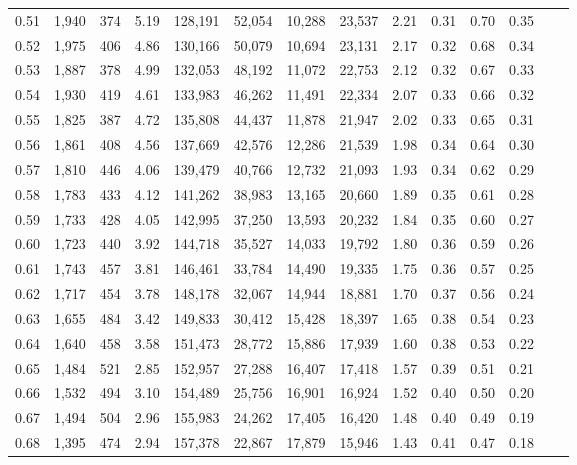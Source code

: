 \begin{tabular}{rrrrrrrrrrrrrr}
0.51 &  1,940 &  374 &    5.19 &  128,191 &   52,054 &  10,288 &  23,537 &  2.21 &  0.31 &  0.70 &      0.35 \\
0.52 &  1,975 &  406 &    4.86 &  130,166 &   50,079 &  10,694 &  23,131 &  2.17 &  0.32 &  0.68 &      0.34 \\
0.53 &  1,887 &  378 &    4.99 &  132,053 &   48,192 &  11,072 &  22,753 &  2.12 &  0.32 &  0.67 &      0.33 \\
0.54 &  1,930 &  419 &    4.61 &  133,983 &   46,262 &  11,491 &  22,334 &  2.07 &  0.33 &  0.66 &      0.32 \\
0.55 &  1,825 &  387 &    4.72 &  135,808 &   44,437 &  11,878 &  21,947 &  2.02 &  0.33 &  0.65 &      0.31 \\
0.56 &  1,861 &  408 &    4.56 &  137,669 &   42,576 &  12,286 &  21,539 &  1.98 &  0.34 &  0.64 &      0.30 \\
0.57 &  1,810 &  446 &    4.06 &  139,479 &   40,766 &  12,732 &  21,093 &  1.93 &  0.34 &  0.62 &      0.29 \\
0.58 &  1,783 &  433 &    4.12 &  141,262 &   38,983 &  13,165 &  20,660 &  1.89 &  0.35 &  0.61 &      0.28 \\
0.59 &  1,733 &  428 &    4.05 &  142,995 &   37,250 &  13,593 &  20,232 &  1.84 &  0.35 &  0.60 &      0.27 \\
0.60 &  1,723 &  440 &    3.92 &  144,718 &   35,527 &  14,033 &  19,792 &  1.80 &  0.36 &  0.59 &      0.26 \\
0.61 &  1,743 &  457 &    3.81 &  146,461 &   33,784 &  14,490 &  19,335 &  1.75 &  0.36 &  0.57 &      0.25 \\
0.62 &  1,717 &  454 &    3.78 &  148,178 &   32,067 &  14,944 &  18,881 &  1.70 &  0.37 &  0.56 &      0.24 \\
0.63 &  1,655 &  484 &    3.42 &  149,833 &   30,412 &  15,428 &  18,397 &  1.65 &  0.38 &  0.54 &      0.23 \\
0.64 &  1,640 &  458 &    3.58 &  151,473 &   28,772 &  15,886 &  17,939 &  1.60 &  0.38 &  0.53 &      0.22 \\
0.65 &  1,484 &  521 &    2.85 &  152,957 &   27,288 &  16,407 &  17,418 &  1.57 &  0.39 &  0.51 &      0.21 \\
0.66 &  1,532 &  494 &    3.10 &  154,489 &   25,756 &  16,901 &  16,924 &  1.52 &  0.40 &  0.50 &      0.20 \\
0.67 &  1,494 &  504 &    2.96 &  155,983 &   24,262 &  17,405 &  16,420 &  1.48 &  0.40 &  0.49 &      0.19 \\
0.68 &  1,395 &  474 &    2.94 &  157,378 &   22,867 &  17,879 &  15,946 &  1.43 &  0.41 &  0.47 &      0.18 \\

\end{tabular}
